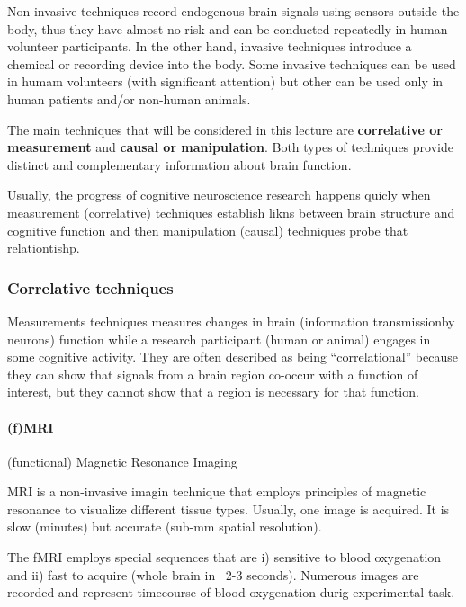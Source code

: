 \documentclass[12pt,article,oneside,a4paper]{memoir}
\begin{document}
Non-invasive techniques record endogenous brain signals using sensors outside the body,
thus they have almost no risk and can be conducted repeatedly in human volunteer
participants. In the other hand, invasive techniques introduce a chemical or recording
device into the body. Some invasive techniques can be used in humam volunteers (with
significant attention) but other can be used only in human patients and/or non-human
animals.

The main techniques that will be considered in this lecture are \textbf{correlative or
measurement} and \textbf{causal or manipulation}. Both types of techniques provide
distinct and complementary information about brain function.

Usually, the progress of cognitive neuroscience research happens quicly when measurement
(correlative) techniques establish likns between brain structure and cognitive function
and then manipulation (causal) techniques probe that relationtishp.

\subsubsection{Correlative techniques}

Measurements techniques measures changes in brain (information transmissionby neurons)
function while a research participant (human or animal) engages in some cognitive
activity. They are often described as being ``correlational'' because they can show that
signals from a brain region co-occur with a function of interest, but they cannot show
that a region is necessary for that function.

\paragraph{(f)MRI} (functional) Magnetic Resonance Imaging

MRI is a non-invasive imagin technique that employs principles of magnetic resonance to
visualize different tissue types. Usually, one image is acquired. It is slow (minutes)
but accurate (sub-mm spatial resolution).

The fMRI employs special sequences that are i) sensitive to blood oxygenation and ii)
fast to acquire (whole brain in ~2-3 seconds). Numerous images are recorded and represent
timecourse of blood oxygenation durig experimental task.
\end{document}
